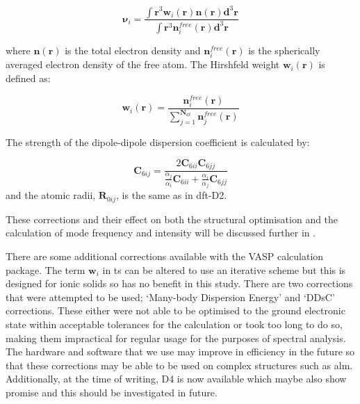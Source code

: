 \begin{equation}
\boldsymbol{\nu}_i = \frac{\int \boldsymbol{r}^3 \boldsymbol{w}_i (\mathbf{r}) \boldsymbol{n} (\mathbf{r}) \boldsymbol{d}^3\mathbf{r}}{\int \boldsymbol{r}^3 \boldsymbol{n}_i^{free}(\mathbf{r}) \boldsymbol{d}^3 \mathbf{r}}
\end{equation}

where \(\boldsymbol{n}(\mathbf{r})\) is the total electron density and \(\boldsymbol{n}_i^{free}(\mathbf{r})\) is the spherically averaged electron density of the free atom. The Hirshfeld weight \(\boldsymbol{w}_i (\mathbf{r})\) is defined as:

\begin{equation}
\boldsymbol{w}_i (\mathbf{r}) = \frac{\boldsymbol{n}_i^{free}(\mathbf{r})}{\sum_{j=1}^{\boldsymbol{N}_{at}} \boldsymbol{n}_j^{free} (\mathbf{r})}
\end{equation}
    
The strength of the dipole-dipole dispersion coefficient is calculated by:

\begin{equation}
\boldsymbol{C}_{6ij} = \frac{2 \boldsymbol{C}_{6ii} \boldsymbol{C}_{6jj}}{{\frac{\alpha_j}{\alpha_i}} \boldsymbol{C}_{6ii} + \frac{\alpha_i}{\alpha_j} \boldsymbol{C}_{6jj}}
\end{equation}
and the atomic radii, \( \boldsymbol{R}_{0ij} \), is the same as in \acrshort{dft}-D2.

These corrections and their effect on both the structural optimisation and the calculation of mode frequency and intensity will be discussed further in .

There are some additional corrections available with the VASP calculation package. The term \(\boldsymbol{w}_i\) in \acrshort{ts} can be altered to use an iterative scheme but this is designed for ionic solids so has no benefit in this study. There are two corrections that were attempted to be used; `Many-body Dispersion Energy' \cite{PhysRevLett.108.236402} and `DDsC' \cite{Steinmann2011} corrections. These either were not able to be optimised to the ground electronic state within acceptable tolerances for the calculation or took too long to do so, making them impractical for regular usage for the purposes of spectral analysis. The hardware and software that we use may improve in efficiency in the future so that these corrections may be able to be used on complex structures such as \acrshort{alm}. Additionally, at the time of writing, D4 \cite{Caldeweyher2017} is now available which maybe also show promise and this should be investigated in future. 

